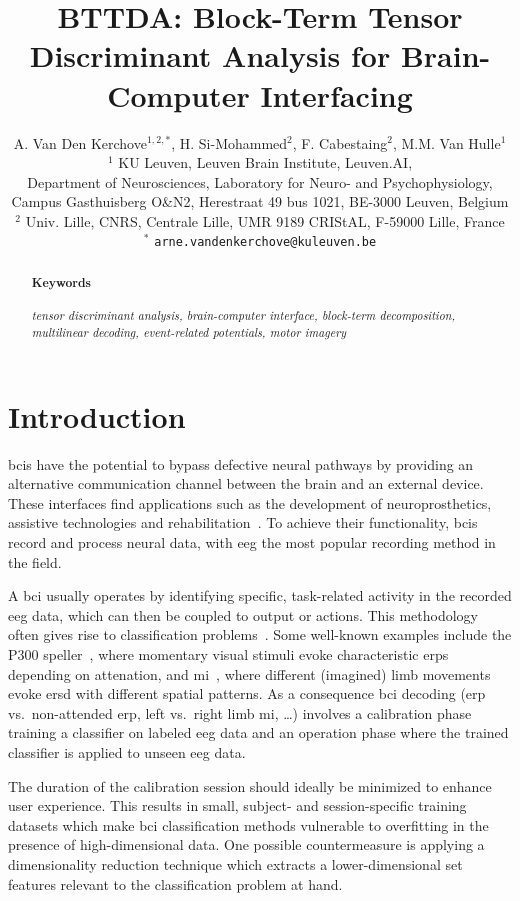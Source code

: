 \documentclass[twocolumn]{article}
\title{BTTDA: Block-Term Tensor Discriminant Analysis for Brain-Computer Interfacing}
\author{%
	A. Van Den Kerchove$^{1,2,*}$,
	H. Si-Mohammed$^{2}$,
	F. Cabestaing$^{2}$,
	M.M. Van Hulle$^{1}$
	\bigskip\\
	$^1$ KU Leuven,
	Leuven Brain Institute,
	Leuven.AI,\\
	Department of Neurosciences,
	Laboratory for Neuro- and Psychophysiology,	\\
	Campus Gasthuisberg O\&N2,
	Herestraat 49 bus 1021,
	BE-3000 Leuven,
	Belgium
	\smallskip\\
	$^2$ Univ. Lille, CNRS, Centrale Lille,
	UMR 9189 CRIStAL,
	F-59000 Lille,
	France
	\smallskip\\
	$^*$ \texttt{arne.vandenkerchove@kuleuven.be}
}
\begin{document}
\maketitle

\begin{abstract}
	

	\paragraph{Keywords}
	\emph{%
		tensor discriminant analysis,
		brain-computer interface,
		block-term decomposition,
		multilinear decoding,
		event-related potentials,
		motor imagery
	}
\end{abstract}


\section{Introduction}

\Acp{bci} have the potential to bypass
defective neural pathways by providing an alternative communication channel
between the brain and an external device.
These interfaces find applications such as the development of
neuroprosthetics, assistive technologies and rehabilitation~\cite{Wolpaw2020}.
To achieve their functionality, \acp{bci} record and process neural data,  with
\ac{eeg} the most popular recording method in the field.

A \ac{bci} usually operates by identifying specific, task-related activity in
the recorded \ac{eeg} data, which can then be coupled to output or actions.
This methodology often gives rise to classification problems~\cite{Lotte2018}.
Some well-known examples include the P300 speller~\cite{Krusienski2006}, where
momentary visual stimuli evoke characteristic \acp{erp} depending on attenation,
and \ac{mi}~\cite{Aggarwal2019}, where different (imagined) limb movements evoke
\ac{ersd} with different spatial patterns.
As a consequence \ac{bci} decoding (\ac{erp} vs.\ non-attended \ac{erp}, left
vs.\ right limb \ac{mi}, \ldots) involves a calibration phase training a classifier
on labeled \ac{eeg} data and an operation phase where the trained classifier is applied
to unseen \ac{eeg} data.

The duration of the calibration session should ideally be minimized to enhance
user experience.
This results in small, subject- and session-specific training datasets
which make \ac{bci} classification methods vulnerable to overfitting in the
presence of high-dimensional data.
One possible countermeasure is applying a dimensionality reduction technique
which extracts a lower-dimensional set features relevant to the classification
problem at hand.
\end{document}
